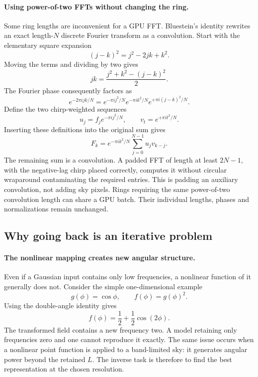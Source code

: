 \documentclass[11pt]{article}
\begin{document}
\paragraph{Using power-of-two FFTs without changing the ring.}
Some ring lengths are inconvenient for a GPU FFT. Bluestein's identity
rewrites an exact length-$N$ discrete Fourier transform as a convolution.
Start with the elementary square expansion
\begin{equation}
 (j-k)^2=j^2-2jk+k^2.
\end{equation}
Moving the terms and dividing by two gives
\begin{equation}
 jk=\frac{j^2+k^2-(j-k)^2}{2}.
\end{equation}
The Fourier phase consequently factors as
\begin{equation}
 e^{-2\pi ijk/N}
 =e^{-\pi ij^2/N}e^{-\pi ik^2/N}e^{+\pi i(j-k)^2/N}.
\end{equation}
Define the two chirp-weighted sequences
\begin{equation}
 u_j=f_j e^{-\pi ij^2/N},\qquad v_t=e^{+\pi it^2/N}.
\end{equation}
Inserting these definitions into the original sum gives
\begin{equation}
 F_k=e^{-\pi ik^2/N}\sum_{j=0}^{N-1}u_j v_{k-j}.
\end{equation}
The remaining sum is a convolution. A padded FFT of length at least
$2N-1$, with the negative-lag chirp placed correctly, computes it without
circular wraparound contaminating the required entries. This is padding
an auxiliary convolution, not adding sky pixels. Rings requiring the same
power-of-two convolution length can share a GPU batch. Their individual
lengths, phases and normalizations remain unchanged.

\subsection{Why going back is an iterative problem}

\paragraph{The nonlinear mapping creates new angular structure.}
Even if a Gaussian input contains only low frequencies, a nonlinear
function of it generally does not. Consider the simple one-dimensional
example
\begin{equation}
 g(\phi)=\cos\phi,\qquad f(\phi)=g(\phi)^2.
\end{equation}
Using the double-angle identity gives
\begin{equation}
 f(\phi)=\frac12+\frac12\cos(2\phi).
\end{equation}
The transformed field contains a new frequency two. A model retaining
only frequencies zero and one cannot reproduce it exactly. The same issue
occurs when a nonlinear point function is applied to a band-limited sky:
it generates angular power beyond the retained $L$. The inverse task is
therefore to find the best representation at the chosen resolution.
\end{document}
